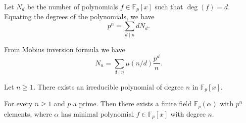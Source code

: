 \begin{corollary}
   Let \(N_d\) be the number of polynomials \(f \in \mathbb{F}_p[x]\) such that
   \(\deg(f) = d\). Equating the degrees of the polynomials, we have
   \[
      p^n = \sum_{d \mid n} d N_d.
   \] 
\end{corollary}

\begin{corollary}
   From Möbius inversion formula we have
   \[
      N_n = \sum_{d \mid n} \mu(n/d) \frac{p^d}{n}.
   \] 
\end{corollary}

\begin{corollary}
   Let \(n \geqslant  1\). There exists an irreducible polynomial of degree
   \(n\) in \(\mathbb{F}_p[x]\).
\end{corollary}

\begin{theorem}
   For every \(n \geqslant 1\) and \(p\) a prime. Then there exists a finite
   field \(\mathbb{F}_p(\alpha)\) with  \(p^n\) elements, where \(\alpha\) has
   minimal polynomial \(f \in \mathbb{F}_p[x]\) with degree \(n\).
\end{theorem}
